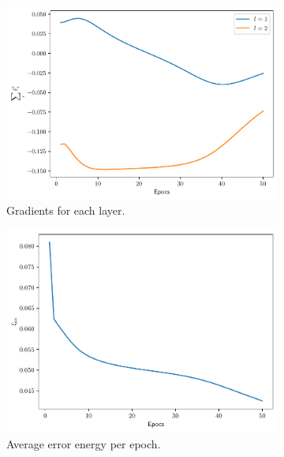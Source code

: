 \documentclass[conference]{IEEEtran}
\theoremstyle{definition}
\theoremstyle{remark}
\theoremstyle{remark}
\begin{document}
\begin{figure}
    \centering
    \begin{subfigure}[b]{0.32\textwidth}
        \centering
        \includegraphics[width=\textwidth]{figs/2-0.9-gradients.pdf}
        \caption{Gradients for each layer.}
    \end{subfigure}
    \begin{subfigure}[b]{0.32\textwidth}
        \centering
        \includegraphics[width=\textwidth]{figs/2-0.9-error.pdf}
        \caption{Average error energy per epoch.}
    \end{subfigure}
    \begin{subfigure}[b]{0.32\textwidth}
        \centering

\end{subfigure}
\end{figure}
\end{document}

